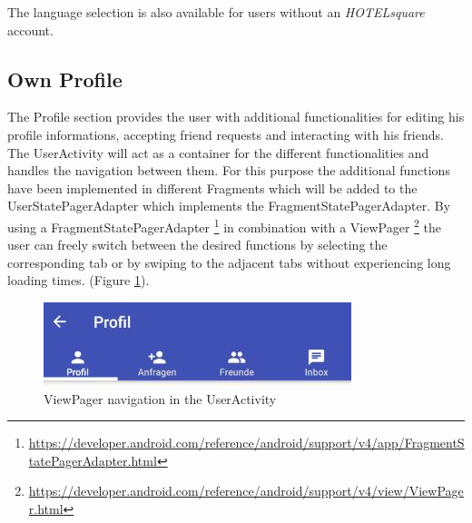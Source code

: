 The language selection is also available for users without an \textit{HOTELsquare} account.

\subsection{Own Profile}
The Profile section provides the user with additional functionalities for editing his profile informations, accepting friend requests and interacting with his friends. The UserActivity will act as a container for the different functionalities and handles the navigation between them. For this purpose the additional functions have been implemented in different Fragments which will be added to the UserStatePagerAdapter which implements the FragmentStatePagerAdapter. By using a FragmentStatePagerAdapter \footnote{\url{https://developer.android.com/reference/android/support/v4/app/FragmentStatePagerAdapter.html}} in combination with a ViewPager \footnote{\url{https://developer.android.com/reference/android/support/v4/view/ViewPager.html}} the user can freely switch between the desired functions by selecting the corresponding tab or by swiping to the adjacent tabs without experiencing long loading times. (Figure \ref{fig:profile_tabbar}).
\begin{figure}[htbp]
	\includegraphics[width=0.8\textwidth]{images/profile_tabbar.jpg}
	\centering
	\caption{ViewPager navigation in the UserActivity}\label{fig:profile_tabbar}
\end{figure}

